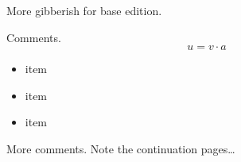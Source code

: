 \documentclass{book}
\begin{document}
More gibberish for base edition.

\lipsum[15-17]

\begin{commeditComments}
  Comments.
  \kant[4]
  \begin{equation}
    u=v\cdot a
  \end{equation}
\end{commeditComments}

\lipsum[3-2]

\begin{commeditComments}
  \begin{itemize}
  \item item
  \item item
  \item item
  \end{itemize}

  
  \pagebreak
  More comments.  Note the continuation pages\ldots
  \kant[8-20]
\end{commeditComments}

\lipsum[9-20]
\end{document}
